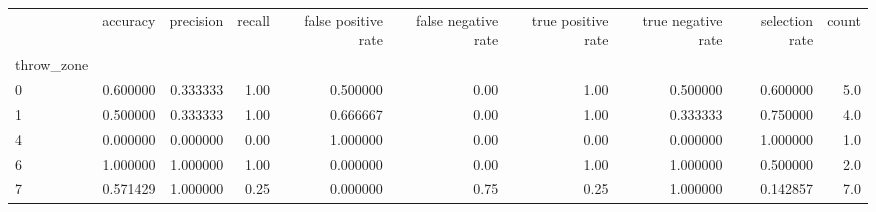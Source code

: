 \begin{tabular}{lrrrrrrrrr}
\toprule
{} &  accuracy &  precision &  recall &  false positive rate &  false negative rate &  true positive rate &  true negative rate &  selection rate &  count \\
throw\_zone &           &            &         &                      &                      &                     &                     &                 &        \\
\midrule
0          &  0.600000 &   0.333333 &    1.00 &             0.500000 &                 0.00 &                1.00 &            0.500000 &        0.600000 &    5.0 \\
1          &  0.500000 &   0.333333 &    1.00 &             0.666667 &                 0.00 &                1.00 &            0.333333 &        0.750000 &    4.0 \\
4          &  0.000000 &   0.000000 &    0.00 &             1.000000 &                 0.00 &                0.00 &            0.000000 &        1.000000 &    1.0 \\
6          &  1.000000 &   1.000000 &    1.00 &             0.000000 &                 0.00 &                1.00 &            1.000000 &        0.500000 &    2.0 \\
7          &  0.571429 &   1.000000 &    0.25 &             0.000000 &                 0.75 &                0.25 &            1.000000 &        0.142857 &    7.0 \\
\bottomrule
\end{tabular}

